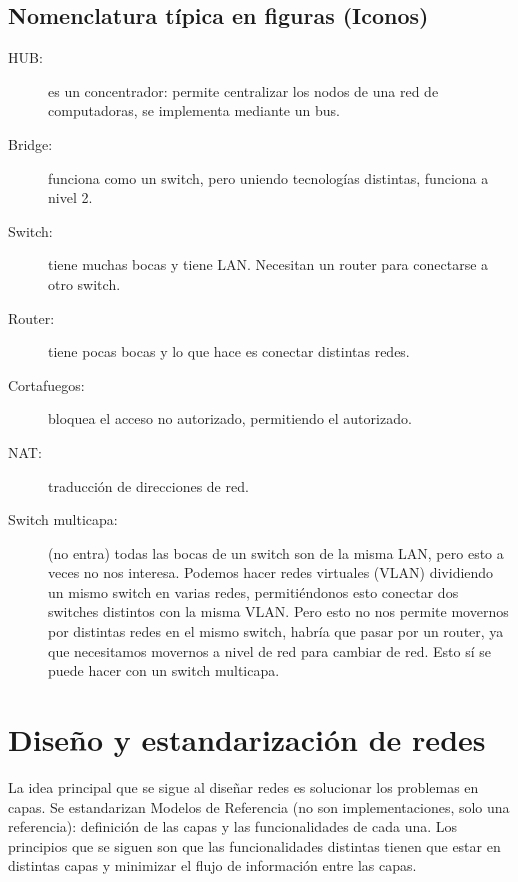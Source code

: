 \subsection{Nomenclatura típica en figuras (Iconos)}
\begin{description}
    \item[HUB:] es un concentrador: permite centralizar los nodos de una red de computadoras, se implementa mediante un bus. 
    \item[Bridge:] funciona como un switch, pero uniendo tecnologías distintas, funciona a nivel 2. 
    \item[Switch:] tiene muchas bocas y tiene LAN\@. Necesitan un router para conectarse a otro switch.
    \item[Router:] tiene pocas bocas y lo que hace es conectar distintas redes. 
    \item[Cortafuegos:] bloquea el acceso no autorizado, permitiendo el autorizado. 
    \item[NAT:] traducción de direcciones de red. 
    \item[Switch multicapa:] (no entra) todas las bocas de un switch son de la misma LAN, pero esto a veces no nos interesa. Podemos hacer redes virtuales (VLAN) dividiendo un mismo switch en varias redes, permitiéndonos esto conectar dos switches distintos con la misma VLAN\@. Pero esto no nos permite movernos por distintas redes en el mismo switch, habría que pasar por un router, ya que necesitamos movernos a nivel de red para cambiar de red. Esto sí se puede hacer con un switch multicapa. 
\end{description}

\section{Diseño y estandarización de redes}

La idea principal que se sigue al diseñar redes es solucionar los problemas en capas. Se estandarizan Modelos de Referencia (no son implementaciones, solo una referencia): definición de las capas y las funcionalidades de cada una. Los principios que se siguen son que las funcionalidades distintas tienen que estar en distintas capas y minimizar el flujo de información entre las capas.\\


